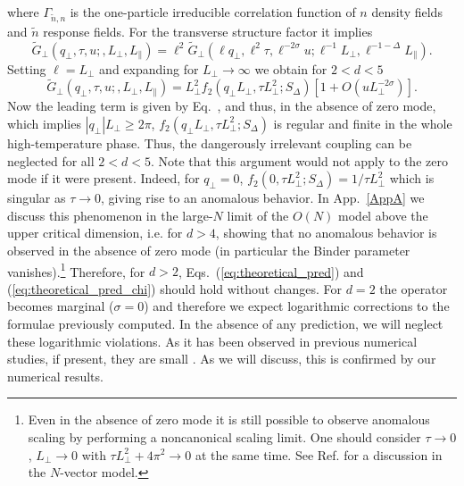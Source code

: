 \documentclass[12pt]{article}
\begin{document}
where $\Gamma_{\tilde n,n}$ is the one-particle irreducible correlation
function of $n$ density fields and $\tilde{n}$ response fields.
For the transverse structure factor it implies
\begin{equation}
\tilde{G}_\bot(q_\bot,\tau,u;,L_{\bot},L_{\|}) =
  \ell^2 \tilde{G}_\bot(\ell q_\bot,\ell^2 \tau, \ell^{-2\sigma}u;
     \ell^{-1} L_{\bot}, \ell^{-1-\Delta} L_{\|}).
\end{equation}
Setting $\ell = L_\bot$ and expanding for $L_\bot\to\infty$ we obtain for 
$2 < d < 5$
\begin{equation}
\tilde{G}_\bot(q_\bot,\tau,u;,L_{\bot},L_{\|}) = 
   L_\bot^2 f_2(q_\bot L_\bot, \tau L_\bot^2;S_\Delta) 
   [1 + O(uL^{-2\sigma}_\bot)].
\end{equation} 
Now the leading term is given by Eq.~, and thus, in the 
absence of zero mode, which implies $|q_\bot| L_\bot \ge 2\pi$, 
$f_2(q_\bot L_\bot, \tau L_\bot^2;S_\Delta)$ is regular and finite in the 
whole high-temperature phase. Thus, the dangerously irrelevant coupling 
can be neglected for all $2 < d < 5$. 
Note that this argument  would not apply to the zero mode if it were present.
Indeed, for $q_\bot = 0$, $f_2(0, \tau L_\bot^2;S_\Delta) = 1/\tau L^2_\bot$ 
which is singular as $\tau \to 0$, giving rise to an anomalous behavior.
In App.~\ref{AppA} we discuss this phenomenon
in the large-$N$ limit of the $O(N)$ model above the upper critical dimension,
i.e. for $d > 4$, showing that no anomalous behavior is observed in the 
absence of zero mode (in particular the Binder parameter 
vanishes).\footnote{Even in the absence of zero mode it is still possible 
to observe anomalous scaling by performing a noncanonical scaling limit.
One should consider $\tau \to 0$, $L_\bot\to0$ with  
$\tau L_\bot^2 + 4 \pi^2 \to 0$ at the same time. 
See Ref. \cite{correlation_length} for a discussion 
in the $N$-vector model.} Therefore, for $d > 2$,
Eqs.~(\ref{eq:theoretical_pred}) and (\ref{eq:theoretical_pred_chi})
should hold without changes.
For $d =2$ the operator becomes marginal
($\sigma=0$) and therefore we expect logarithmic corrections to the
formulae previously computed. In the absence of any prediction, we will neglect
these logarithmic violations. As it has been observed in previous
numerical studies, if present, they are small \cite{Leung92}.
As we will discuss, this is confirmed by our numerical results.  
\end{document}
